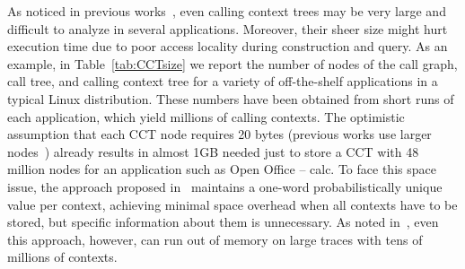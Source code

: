 \documentclass[preprint]{sigplanconf}
\begin{document}
As noticed in previous works~\cite{BM07, ZSCC06}, even calling context trees may be very large and difficult to analyze in several applications. Moreover, their sheer size might hurt execution time due to poor access locality during construction and query. As an example, in Table~\ref{tab:CCTsize} we report the number of nodes of the call graph, call tree, and calling context tree for a variety of off-the-shelf applications in a typical Linux distribution. These numbers have been obtained from short runs of each application, which yield millions of calling contexts. The optimistic assumption that each CCT node requires 20 bytes (previous works use larger nodes~\cite{ABL97,S04}) already results in almost 1GB needed just to store a CCT with 48 million nodes for an application such as Open Office -- calc. To face this space issue, the approach proposed in~\cite{BM07} maintains a one-word probabilistically unique value per context, achieving minimal space overhead when all contexts have to be stored, but specific information about them is unnecessary. As noted in~\cite{BM07}, even this approach, however, can run out of memory on large traces with tens of millions of contexts.
\end{document}
